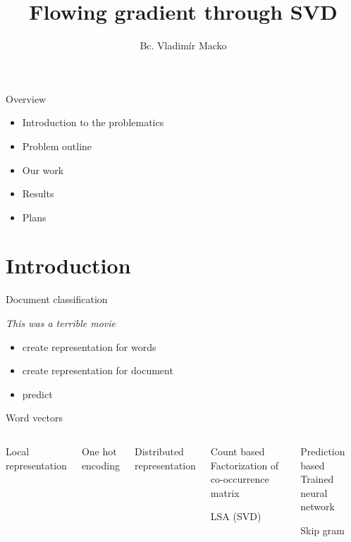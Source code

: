 \documentclass[xcolor={table}]{beamer}
\title{Flowing gradient through SVD}
\author{Bc. Vladimír Macko}
\institute{RNDr. Radim Řehůřek, Ph.D}
\begin{document}
        
\begin{frame}
    \titlepage
\end{frame}
    
\begin{frame}{Overview}
    \begin{block}{}
        \begin{itemize}
            \item Introduction to the problematics
            \item Problem outline
            \item Our work
            \item Results
            \item Plans
        \end{itemize}
    \end{block}
\end{frame}


\section{Introduction}
\begin{frame}{Document classification}
	\begin{block}{}
		\emph{This was a terrible movie}
	\end{block}
	
    \begin{block}{}   
        \begin{itemize}
            \item create representation for words
            \item create representation for document
            \item predict
        \end{itemize}
    \end{block}
\end{frame} 

\begin{frame}{Word vectors}
    \begin{columns}
        Local representation
        \begin{block}{}
            One hot encoding
        \end{block}

        Distributed representation
        \begin{block}{Count based}
            Factorization of co-occurrence matrix
            
            LSA (SVD)
        \end{block}
        \begin{block}{Prediction based}
            Trained neural network

            Skip gram    
        \end{block}    
   \end{columns}
\end{frame} 
\end{document}
